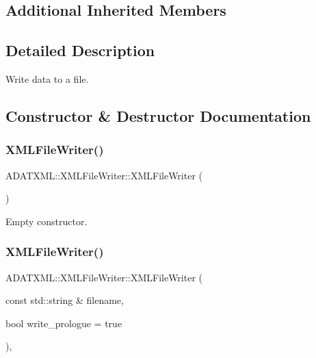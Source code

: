 \subsection*{Additional Inherited Members}


\subsection{Detailed Description}
Write data to a file. 

\subsection{Constructor \& Destructor Documentation}
\mbox{\label{classADATXML_1_1XMLFileWriter_a40db177b66a4598583a3a08e19c1e927}} 
\subsubsection{\texorpdfstring{XMLFileWriter()}{XMLFileWriter()}\hspace{0.1cm}{\footnotesize\ttfamily [1/4]}}
{\footnotesize\ttfamily A\+D\+A\+T\+X\+M\+L\+::\+X\+M\+L\+File\+Writer\+::\+X\+M\+L\+File\+Writer (\begin{DoxyParamCaption}{ }\end{DoxyParamCaption})}



Empty constructor. 

\mbox{\label{classADATXML_1_1XMLFileWriter_a83cf749ff969a30d3de1895f271b238a}} 
\subsubsection{\texorpdfstring{XMLFileWriter()}{XMLFileWriter()}\hspace{0.1cm}{\footnotesize\ttfamily [2/4]}}
{\footnotesize\ttfamily A\+D\+A\+T\+X\+M\+L\+::\+X\+M\+L\+File\+Writer\+::\+X\+M\+L\+File\+Writer (\begin{DoxyParamCaption}\item[{const std\+::string \&}]{filename,  }\item[{bool}]{write\+\_\+prologue = {\ttfamily true} }\end{DoxyParamCaption})\hspace{0.3cm}{\ttfamily [inline]}, {\ttfamily [explicit]}}




